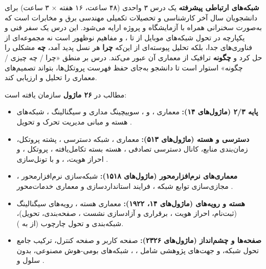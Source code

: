 
\textbf{شبکه‌های ارتباطی پیشرفته} یک درس ۳ واحدی (۴۸ ساعت، ۱۶ هفته \ensuremath{\times} ۳ ساعت) برای دانشجویان سال آخر کارشناسی و تحصیلات تکمیلی مهندسی برق و مخابرات است که به‌صورت سخنرانی همراه با آزمایشگاه و پروژه ارایه می‌شود. این درس یک سفر فنی و یکپارچه در تحول شبکه‌های موبایل از  تا ،  و مفاهیم نوظهور  است  نه مجموعه‌ای از فناوری‌های جدا، بلکه تحلیل پیوسته‌ای از این‌که \textbf{چرا} هر نسل پدید آمد، \textbf{چه} مشکلی را حل کرد و \textbf{چگونه} ترافیک از معماری آن عبور می‌کند. درس بر منطق «چرا /\allowbreak{} چه چیزی /\allowbreak{} چگونه» استوار است تا دانشجو به‌جای حفظ فهرست پروتکل‌ها، بتواند تصمیم‌های معماری را تحلیل و ارزیابی کند.


مطالب در \textbf{۲۶ ماژول} سازمان یافته است:

\begin{itemize}
\tightlist
\item
  \textbf{پایه ۲/\allowbreak{}۳ (ماژول‌های ۱۴):} معماری ،  و ، سوییچینگ مداری و سیگنالینگ ، شبکه‌های هسته  و مبانی مدیریت تحرک و تحویل .
\item
  \textbf{دسترسی و هسته  (ماژول‌های ۵۱۳):} معماری ، شبکه دسترسی ، پشته پروتکل، زمان‌بندی منابع، کانال دسترسی تصادفی ، هسته بسته تکامل‌یافته ، پروتکل ،  و احراز هویت، ، و  با تونل‌سازی .
\item
  \textbf{معماری‌های نرم‌افزارمحور (ماژول‌های ۱۵۱۸):} شبکه‌سازی نرم‌افزارمحور ، مجازی‌سازی توابع شبکه ، فرایند استانداردسازی  و معماری خدمات‌محور .
\item
  \textbf{هسته و رویه‌های  (ماژول‌های ۱۴، ۱۹۲۲):} معماری هسته ، رویه‌های سیگنالینگ (ثبت‌نام، احراز هویت ، برقراری و آزادسازی نشست ، صفحه‌بندی، تحویل)، شبکه‌بندی و تحول چارچوب  (از  به ).
\item
  \textbf{صفحه‌ها و چشم‌انداز (ماژول‌های ۲۳۲۶):} صفحه کاربر و صفحه کنترل، ترکیب جامع تحول شبکه، و جهت‌های پژوهشی  شامل ، ، شبکه‌های بومی-هوش مصنوعی،  بدون سلول و .
\end{itemize}

